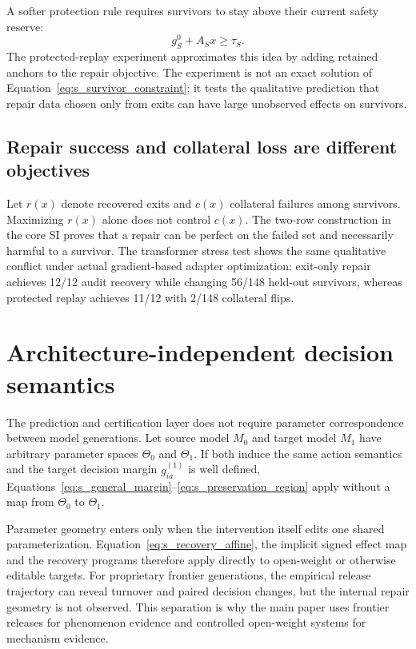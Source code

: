 \documentclass[11pt,letterpaper]{article}
\theoremstyle{plain}
\newcommand{\1}{\mathbf 1}
\begin{document}
A softer protection rule requires survivors to stay above their current safety reserve:
\begin{equation}
 g_S^0+A_Sx\ge \tau_S.
\label{eq:s_survivor_constraint}
\end{equation}
The protected-replay experiment approximates this idea by adding retained anchors to the repair objective. The experiment is not an exact solution of Equation~\ref{eq:s_survivor_constraint}; it tests the qualitative prediction that repair data chosen only from exits can have large unobserved effects on survivors.

\subsection{Repair success and collateral loss are different objectives}
Let $r(x)$ denote recovered exits and $c(x)$ collateral failures among survivors. Maximizing $r(x)$ alone does not control $c(x)$. The two-row construction in the core SI proves that a repair can be perfect on the failed set and necessarily harmful to a survivor. The transformer stress test shows the same qualitative conflict under actual gradient-based adapter optimization: exit-only repair achieves 12/12 audit recovery while changing 56/148 held-out survivors, whereas protected replay achieves 11/12 with 2/148 collateral flips.

\section{Architecture-independent decision semantics}
The prediction and certification layer does not require parameter correspondence between model generations. Let source model $M_0$ and target model $M_1$ have arbitrary parameter spaces $\Theta_0$ and $\Theta_1$. If both induce the same action semantics and the target decision margin $g_{ia}^{(1)}$ is well defined, Equations~\ref{eq:s_general_margin}--\ref{eq:s_preservation_region} apply without a map from $\Theta_0$ to $\Theta_1$.

Parameter geometry enters only when the intervention itself edits one shared parameterization. Equation~\ref{eq:s_recovery_affine}, the implicit signed effect map and the recovery programs therefore apply directly to open-weight or otherwise editable targets. For proprietary frontier generations, the empirical release trajectory can reveal turnover and paired decision changes, but the internal repair geometry is not observed. This separation is why the main paper uses frontier releases for phenomenon evidence and controlled open-weight systems for mechanism evidence.
\end{document}
